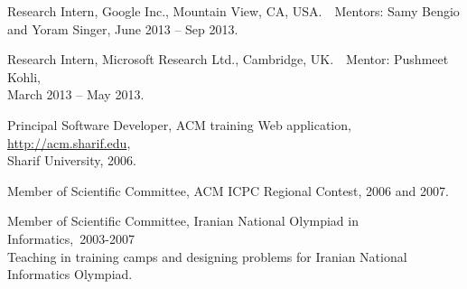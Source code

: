 \documentclass[10pt,letterpaper]{article}
\renewenvironment{itemize}{
  \begin{list}{}{
    \setlength{\leftmargin}{1.5em}
  }
}{
  \end{list}
}
\begin{document}
\begin{itemize}

\item Research Intern, Google Inc., Mountain View, CA, USA.~~Mentors:
  Samy Bengio and Yoram Singer,  June 2013 -- Sep 2013.

\item Research Intern, Microsoft Research Ltd., Cambridge, UK.~~Mentor:
  Pushmeet Kohli,\\ March 2013 -- May 2013.

\item Principal Software Developer, ACM training Web application, \href{http://acm.sharif.edu/arbiter/home.jsf?locale=en}{http://acm.sharif.edu}, \\
Sharif University, 2006.

\item Member of Scientific Committee, ACM ICPC Regional Contest, 2006 and 2007.

\item Member of Scientific Committee, Iranian National Olympiad in Informatics,~2003-2007 \\
  Teaching in training camps and designing problems
  for Iranian National Informatics Olympiad.







\end{itemize}
\end{document}
